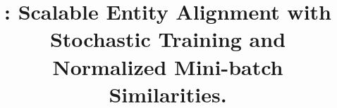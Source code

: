 \documentclass[sigconf, anonymous, review]{acmart}
\begin{document}

\title{\ClusterEA{}: Scalable Entity Alignment with Stochastic Training and Normalized Mini-batch Similarities.}

%







\end{document}
